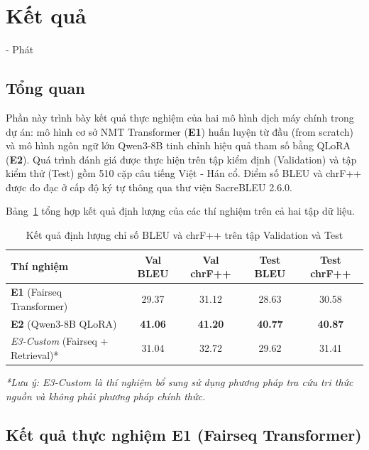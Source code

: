\section{Kết quả} - Phát






\subsection{Tổng quan}

Phần này trình bày kết quả thực nghiệm của hai mô hình dịch máy chính trong dự án: mô hình cơ sở NMT Transformer (\textbf{E1}) huấn luyện từ đầu (from scratch) và mô hình ngôn ngữ lớn Qwen3-8B tinh chỉnh hiệu quả tham số bằng QLoRA (\textbf{E2}). Quá trình đánh giá được thực hiện trên tập kiểm định (Validation) và tập kiểm thử (Test) gồm 510 cặp câu tiếng Việt - Hán cổ. Điểm số BLEU và chrF++ được đo đạc ở cấp độ ký tự thông qua thư viện SacreBLEU 2.6.0.

Bảng~\ref{tab:quantitative_results} tổng hợp kết quả định lượng của các thí nghiệm trên cả hai tập dữ liệu.

\begin{table}[htbp]
\centering
\small
\caption{Kết quả định lượng chỉ số BLEU và chrF++ trên tập Validation và Test}
\label{tab:quantitative_results}
\begin{tabular}{lcccc}
\toprule
\textbf{Thí nghiệm} & \textbf{Val BLEU} & \textbf{Val chrF++} & \textbf{Test BLEU} & \textbf{Test chrF++} \\
\midrule
\textbf{E1} (Fairseq Transformer) & 29.37 & 31.12 & 28.63 & 30.58 \\
\textbf{E2} (Qwen3-8B QLoRA) & \textbf{41.06} & \textbf{41.20} & \textbf{40.77} & \textbf{40.87} \\
\textit{E3-Custom} (Fairseq + Retrieval)* & 31.04 & 32.72 & 29.62 & 31.41 \\ \bottomrule
\end{tabular}
\newline
\small{\textit{*Lưu ý: E3-Custom là thí nghiệm bổ sung sử dụng phương pháp tra cứu tri thức nguồn và không phải phương pháp chính thức.}}
\end{table}

\subsection{Kết quả thực nghiệm E1 (Fairseq Transformer)} 

